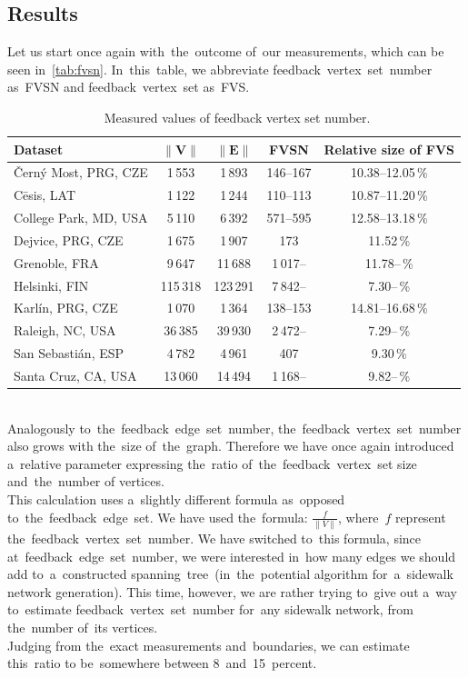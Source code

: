 \subsection{Results}
Let us start once again with~the~outcome of~our measurements, which can be seen in~\autoref{tab:fvsn}. In~this~table, we abbreviate feedback~vertex~set~number as~FVSN and feedback~vertex~set as~FVS.
\begin{table}[h!]
\centering
\caption[Measured values of feedback vertex set number]{~Measured values of feedback vertex set number.}\label{tab:fvsn}
\begin{tabular}{l|c|c|c|c}
	\textbf{Dataset}		& $\|\mathbf{V}\|$		& $\|\mathbf{E}\|$& \textbf{FVSN}   & \textbf{Relative size of FVS}\tabularnewline \hline \hline
 	Černý Most, PRG, CZE & 1\,553	& 1\,893 & 146--167 & 10.38--12.05\,\%\tabularnewline \hline
 	Cēsis, LAT	& 1\,122	& 1\,244	& 110--113 & 10.87--11.20\,\%	\tabularnewline \hline
 	College Park, MD, USA & 5\,110 & 6\,392 & 571--595 & 12.58--13.18\,\%	\tabularnewline \hline
 	Dejvice, PRG, CZE & 1\,675 & 1\,907 & 173 & 11.52\,\%	\tabularnewline \hline
 	Grenoble, FRA & 9\,647 & 11\,688 & 1\,017-- & 11.78--\,\%	\tabularnewline \hline
 	Helsinki, FIN & 115\,318 & 123\,291 & 7\,842-- & 7.30--\,\%	\tabularnewline \hline
 	Karlín, PRG, CZE & 1\,070 & 1\,364 & 138--153 & 14.81--16.68\,\%	\tabularnewline \hline
 	Raleigh, NC, USA & 36\,385 & 39\,930 & 2\,472-- & 7.29--\,\%	\tabularnewline \hline
 	San Sebastián, ESP & 4\,782 & 4\,961 & 407 & 9.30\,\%	\tabularnewline \hline
 	Santa Cruz, CA, USA & 13\,060 & 14\,494 & 1\,168-- & 9.82--\,\%	\tabularnewline
\end{tabular}
\end{table}
\\
Analogously to~the~feedback~edge~set~number, the~feedback~vertex~set~number also grows with the~size of~the~graph. Therefore we have once again introduced a~relative parameter expressing the~ratio of~the~feedback~vertex~set size and~the~number of vertices. \\
This calculation uses a~slightly different formula as~opposed to~the~feedback~edge~set. We have used the~formula: $\frac{f}{\|V\|}$, where~$f$ represent the~feedback~vertex~set~number. We have switched to~this formula, since at~feedback~edge~set~number, we were interested in~how many edges we should add to~a~constructed spanning~tree~(in~the~potential algorithm for~a~sidewalk network generation). This time, however, we are rather trying to~give out a~way to~estimate feedback~vertex~set~number for~any sidewalk network, from the~number of~its vertices.\\
Judging from the~exact measurements and~boundaries, we can estimate this~ratio to be~somewhere between 8~and~15~percent.
